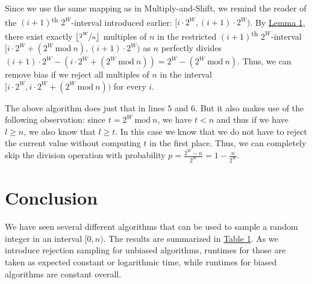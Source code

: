 \documentclass[a4paper, UKenglish, cleveref, autoref, thm-restate]{lipics-v2021}
\newcommand{\Mod}[1]{\ \mathrm{mod}\ #1}
\begin{document}
Since we use the same mapping as in Multiply-and-Shift, we remind the reader of the $(i + 1)$\textsuperscript{th} $2^W$-interval introduced earlier: $[i \cdot 2^W, (i + 1) \cdot 2^W)$.
By \hyperref[lemma:1]{Lemma 1}, there exist exactly $\lfloor\nicefrac{2^W}{n}\rfloor$ multiples of $n$ in the restricted $(i + 1)$\textsuperscript{th} $2^W$-interval $[i \cdot 2^W + (2^W \Mod n), (i + 1) \cdot 2^W)$ as $n$ perfectly divides $(i + 1) \cdot 2^W - (i \cdot 2^W + (2^W \Mod n)) = 2^W - (2^W \Mod n)$.
Thus, we can remove bias if we reject all multiples of $n$ in the interval $[i \cdot 2^W, i \cdot 2^W + (2^W \Mod n))$ for every $i$.

The above algorithm does just that in lines $5$ and $6$.
But it also makes use of the following observation: since $t = 2^W \Mod n$, we have $t < n$ and thus if we have $l \geq n$, we also know that $l \geq t$.
In this case we know that we do not have to reject the current value without computing $t$ in the first place.
Thus, we can completely skip the division operation with probability $p = \frac{2^W - n}{2^W} = 1 - \frac{n}{2^W}$.



\section{Conclusion}\label{sec:4}
We have seen several different algorithms that can be used to sample a random integer in an interval $[0,n)$.
The results are summarized in \hyperref[tab:1]{Table 1}.
As we introduce rejection sampling for unbiased algorithms, runtimes for those are taken as expected constant or logarithmic time, while runtimes for biased algorithms are constant overall.
\end{document}
